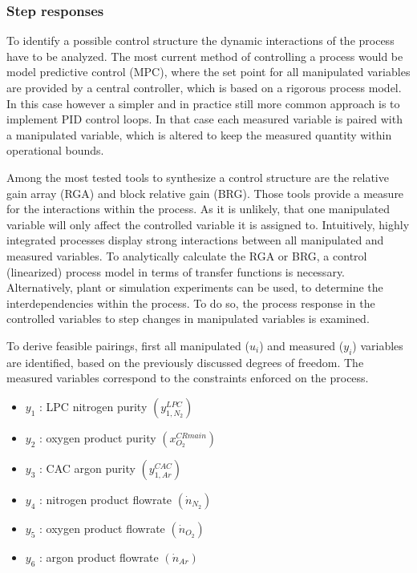         \subsubsection{Step responses}
            To identify a possible control structure the dynamic interactions of the process have to be analyzed.
            The most current method of controlling a process would be model predictive control (MPC), where
            the set point for all manipulated variables are provided by a central controller, which is based
            on a rigorous process model. In this case however a simpler and in practice still more common
            approach is to implement PID control loops. In that case each measured variable is paired
            with a manipulated variable, which is altered to keep the measured quantity within operational
            bounds.

            Among the most tested tools to synthesize a control structure are the relative gain array (RGA) and block
            relative gain (BRG). Those tools provide a measure for the interactions within the process. As it
            is unlikely, that one manipulated variable will only affect the controlled variable it is assigned to.
            Intuitively, highly integrated processes display strong interactions between all manipulated and
            measured variables. To analytically calculate the RGA or BRG, a control (linearized) process model
            in terms of transfer functions is necessary. Alternatively, plant or simulation experiments can be used, 
            to determine the interdependencies within the process. To do so, the process response in the controlled 
            variables to step changes in manipulated variables is examined. 

            To derive feasible pairings, first all manipulated ($u_i$) and measured ($y_i$) variables are identified, 
            based on the previously discussed degrees of freedom. The measured variables correspond to the constraints 
            enforced on the process.
            \begin{itemize}
                \item $y_1$ : LPC nitrogen purity $\left(y_{1,N_2}^{LPC}\right)$
                \item $y_2$ : oxygen product purity $\left(x_{O_2}^{CR main}\right)$
                \item $y_3$ : CAC argon purity $\left(y_{1,Ar}^{CAC}\right)$
                \item $y_4$ : nitrogen product flowrate $\left(\dot{n}_{N_2}\right)$
                \item $y_5$ : oxygen product flowrate $\left(\dot{n}_{O_2}\right)$
                \item $y_6$ : argon product flowrate $\left(\dot{n}_{Ar}\right)$
            \end{itemize}

